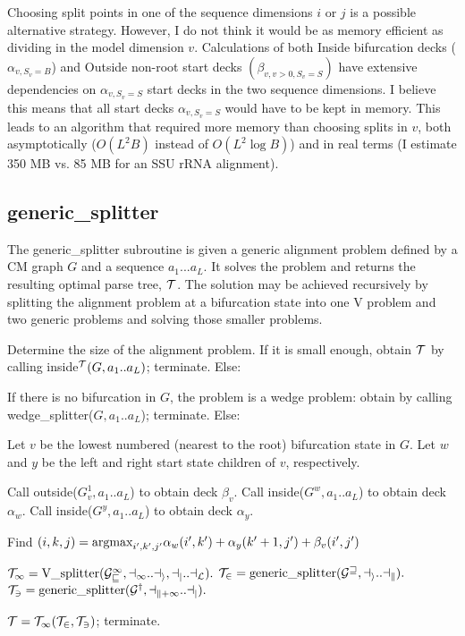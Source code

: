 \documentclass[11pt]{article}
\begin{document}
Choosing split points in one of the sequence dimensions $i$ or $j$ is
a possible alternative strategy. However, I do not think it would be
as memory efficient as dividing in the model dimension
$v$. Calculations of both Inside bifurcation decks ($\alpha_{v,
S_v=B}$) and Outside non-root start decks $(\beta_{v, v > 0, S_v =
S})$ have extensive dependencies on $\alpha_{v,S_v=S}$ start decks in
the two sequence dimensions.  I believe this means that all start
decks $\alpha_{v,S_v=S}$ would have to be kept in memory. This leads
to an algorithm that required more memory than choosing splits in $v$,
both asymptotically ($O(L^2B)$ instead of $O(L^2 \log B)$) and in real
terms (I estimate 350 MB vs. 85 MB for an SSU rRNA alignment).

\subsection{generic\_splitter}

The generic\_splitter subroutine is given a generic alignment problem
defined by a CM graph $G$ and a sequence $a_1...a_L$. It solves the
problem and returns the resulting optimal parse tree, $\cal{T}$. The
solution may be achieved recursively by splitting the alignment
problem at a bifurcation state into one V problem and two generic
problems and solving those smaller problems.

Determine the size of the alignment problem. If it is small enough,
obtain $\cal{T}$ by calling inside$^{\cal{T}}(G, a_1..a_L)$;
terminate.  Else:

If there is no bifurcation in $G$, the problem is a wedge problem:
obtain  by calling wedge\_splitter($G, a_1..a_L$); terminate.
Else:

Let $v$ be the lowest numbered (nearest to the root) bifurcation state
in $G$. Let $w$ and $y$ be the left and right start state children of
$v$, respectively.

Call outside($G^1_v, a_1..a_L$) to obtain deck $\beta_v$.
Call inside($G^w, a_1..a_L$)    to obtain deck $\alpha_w$.
Call inside($G^y, a_1..a_L$)    to obtain deck $\alpha_y$.

Find $(i,k,j) = \mbox{\rm{argmax}}_{i',k',j'} \alpha_w(i',k') + \alpha_y(k'+1,j') + \beta_v(i',j')$ 

$\cal{T}_1 = \mbox{V\_splitter}(G^1_v, a_1..a_i, a_j..a_L).$
$\cal{T}_2 = \mbox{generic\_splitter}(G^w, a_i..a_k).$
$\cal{T}_3 = \mbox{generic\_splitter}(G^y, a_{k+1}..a_j).$

$\cal{T} = \cal{T}_1 (\cal{T}_2, \cal{T}_3)$; terminate.
\end{document}
